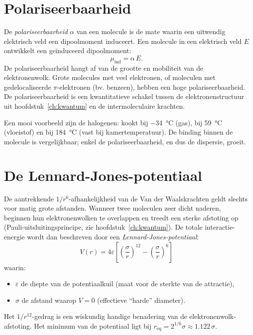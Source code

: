\section{Polariseerbaarheid}

De \emph{polariseerbaarheid} $\alpha$ van een molecule is de mate waarin een uitwendig elektrisch veld een dipoolmoment induceert. Een molecule in een elektrisch veld $E$ ontwikkelt een ge\"induceerd dipoolmoment:
\begin{equation}
\mu_{\text{ind}} = \alpha\,E.
\end{equation}
De polariseerbaarheid hangt af van de grootte en mobiliteit van de elektronenwolk. Grote molecules met veel elektronen, of moleculen met gedelocaliseerde $\pi$-elektronen (bv. benzeen), hebben een hoge polariseerbaarheid. De polariseerbaarheid is een kwantitatieve schakel tussen de elektronenstructuur uit hoofdstuk~\ref{ch:kwantum} en de intermoleculaire krachten.

Een mooi voorbeeld zijn de halogenen:  kookt bij \SI{-34}{\celsius} (gas),  bij \SI{59}{\celsius} (vloeistof) en  bij \SI{184}{\celsius} (vast bij kamertemperatuur). De binding binnen de molecule is vergelijkbaar; enkel de polariseerbaarheid, en dus de dispersie, groeit.

\section{De Lennard-Jones-potentiaal}
\label{sec:lennard-jones}

De aantrekkende $1/r^6$-afhankelijkheid van de Van der Waalskrachten geldt slechts voor matig grote afstanden. Wanneer twee moleculen zeer dicht naderen, beginnen hun elektronenwolken te overlappen en treedt een sterke afstoting op (Pauli-uitsluitingsprincipe, zie hoofdstuk~\ref{ch:kwantum}). De totale interactie-energie wordt dan beschreven door een \emph{Lennard-Jones-potentiaal}:
\begin{equation}
\boxed{\;V(r) = 4\varepsilon\left[\left(\frac{\sigma}{r}\right)^{12} - \left(\frac{\sigma}{r}\right)^{6}\right]\;}
\label{eq:lennardjones}
\end{equation}
waarin:
\begin{itemize}
\item $\varepsilon$ de diepte van de potentiaalkuil (maat voor de sterkte van de attractie),
\item $\sigma$ de afstand waarop $V = 0$ (effectieve ``harde'' diameter).
\end{itemize}
Het $1/r^{12}$-gedrag is een wiskundig handige benadering van de elektronenwolk-afstoting. Het minimum van de potentiaal ligt bij $r_{\text{eq}} = 2^{1/6}\sigma \approx 1.122\,\sigma$.

